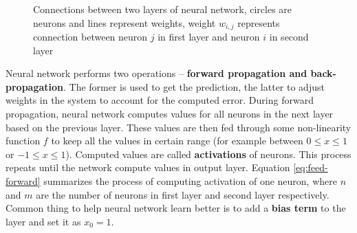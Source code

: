     \begin{figure}
        \centering
        \caption[Connections between two layers of neural network]{Connections between two layers of neural network, circles are neurons and lines represent weights, weight $w_{i, j}$ represents connection between neuron $j$ in first layer and neuron $i$ in second layer}
        \label{fig:neural_network}
    \end{figure}
    Neural network performs two operations -- \textbf{forward propagation and back-propagation}. The former is used to get the prediction, the latter to adjust weights in the system to account for the computed error. During forward propagation, neural network computes values for all neurons in the next layer based on the previous layer. These values are then fed through some non-linearity function $f$ to keep all the values in certain range (for example between $0 \leq x \leq 1$ or $-1 \leq x \leq 1$). Computed values are called \textbf{activations} of neurons. This process repeats until the network compute values in output layer. Equation \ref{eq:feed-forward} summarizes the process of computing activation of one neuron, where $n$ and $m$ are the number of neurons in first layer and second layer respectively. Common thing to help neural network learn better is to add a \textbf{bias term} to the layer and set it as $x_0 = 1$.
